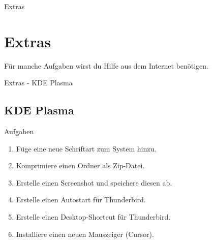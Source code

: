 
\begin{frame}{Extras}
    \section{Extras}\label{sec:extras}
    \pause
    Für manche Aufgaben wirst du Hilfe aus dem Internet benötigen.

\end{frame}

\begin{frame}{Extras - KDE Plasma}
    \subsection{KDE Plasma}\label{subsec:kde plasma}

    \begin{alertblock}{Aufgaben}
        \begin{enumerate} \pause
            \item Füge eine neue Schriftart zum System hinzu.\pause
            \item Komprimiere einen Ordner als Zip-Datei.\pause
            \item Erstelle einen Screenshot und speichere diesen ab.\pause
            \item Erstelle einen Autostart für Thunderbird.\pause
            \item Erstelle einen Desktop-Shortcut für Thunderbird.\pause
            \item Installiere einen neuen Mauszeiger (Cursor).
        \end{enumerate}

    \end{alertblock}

\end{frame}


